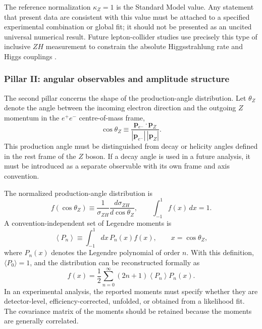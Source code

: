 \documentclass[10pt,a4paper]{article}
\begin{document}
The reference normalization $\kappa_Z=1$ is the Standard Model value. Any statement that present data are consistent with this value must be attached to a specified experimental combination or global fit; it should not be presented as an uncited universal numerical result. Future lepton-collider studies use precisely this type of inclusive $ZH$ measurement to constrain the absolute Higgsstrahlung rate and Higgs couplings \cite{Fujii2017,Chen2016,Snowmass2022}.

\subsubsection{Pillar II: angular observables and amplitude structure}
\label{sec:ewt_pillar_two}

The second pillar concerns the shape of the production-angle distribution. Let $\theta_Z$ denote the angle between the incoming electron direction and the outgoing $Z$ momentum in the $e^+e^-$ centre-of-mass frame,
\begin{equation}
	\cos\theta_Z
	\equiv
	\frac{\mathbf{p}_{e^-}\cdot\mathbf{p}_{Z}}
	{|\mathbf{p}_{e^-}|\,|\mathbf{p}_{Z}|}.
	\label{eq:ewt_theta_z}
\end{equation}
This production angle must be distinguished from decay or helicity angles defined in the rest frame of the $Z$ boson. If a decay angle is used in a future analysis, it must be introduced as a separate observable with its own frame and axis convention.

The normalized production-angle distribution is
\begin{equation}
	f(\cos\theta_Z)
	\equiv
	\frac{1}{\sigma_{ZH}}
	\frac{d\sigma_{ZH}}{d\cos\theta_Z},
	\qquad
	\int_{-1}^{1}f(x)\,dx=1.
	\label{eq:ewt_normalized_angular_distribution}
\end{equation}
A convention-independent set of Legendre moments is
\begin{equation}
	\left\langle P_n\right\rangle
	\equiv
	\int_{-1}^{1}dx\,P_n(x)f(x),
	\qquad x=\cos\theta_Z,
	\label{eq:ewt_legendre_moments}
\end{equation}
where $P_n(x)$ denotes the Legendre polynomial of order $n$. With this definition, $\langle P_0\rangle=1$, and the distribution can be reconstructed formally as
\begin{equation}
	f(x)
	=
	\frac{1}{2}
	\sum_{n=0}^{\infty}(2n+1)\left\langle P_n\right\rangle P_n(x).
	\label{eq:ewt_legendre_expansion}
\end{equation}
In an experimental analysis, the reported moments must specify whether they are detector-level, efficiency-corrected, unfolded, or obtained from a likelihood fit. The covariance matrix of the moments should be retained because the moments are generally correlated.
\end{document}
